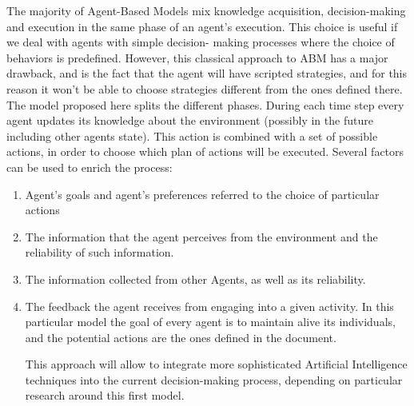 \documentclass[11pt,oneside,a4paper,openright]{report}
\begin{document}


The majority of Agent-Based Models mix knowledge acquisition, decision-making and execution in the
same phase of an agent's execution. This choice is useful if we deal with agents with simple decision-
making processes where the choice of behaviors is predefined. However, this classical approach to
ABM has a major drawback, and is the fact that the agent will have scripted strategies, and for this
reason it won't be able to choose strategies different from the ones defined there.
The model proposed here splits the different phases. During each time step every agent updates its
knowledge about the environment (possibly in the future including other agents state). This action is combined with a set of possible actions, in order to choose which plan of actions will be executed. Several factors can be used to enrich the process:



\begin{enumerate}
	\item Agent's goals and agent's preferences referred to the choice of particular actions
	\item The information that the agent perceives from the environment and the reliability of such
	information.
	\item The information collected from other Agents, as well as its reliability.
	\item The feedback the agent receives from engaging into a given activity.
	In this particular model the goal of every agent is to maintain alive its individuals, and the potential
	actions are the ones defined in the document.

 This approach will allow to integrate more sophisticated Artificial Intelligence techniques into the current decision-making process, depending on particular research around this first model.

\end{enumerate}
\end{document}
